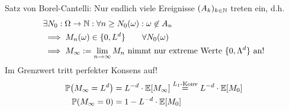 \begin{beisp}[Wählermodell]
Satz von Borel-Cantelli: Nur endlich viele Ereignisse $(A_k)_{k\in\mathbb{N}}$ treten ein, d.h.
\begin{align*}
&\exists N_0:\Omega\to\mathbb{N}:\forall n\geq N_0(\omega):\omega\not\in A_n\\
&\implies M_n(\omega)\in\lbrace0,L^d\rbrace\qquad\forall N_0(\omega)\\
&\implies M_\infty:=\lim\limits_{n\to\infty} M_n\text{ nimmt nur extreme Werte $\lbrace0,\Lambda^d\rbrace$ an!}
\end{align*}
Im Grenzwert tritt perfekter Konsens auf!
\begin{align*}
\mathbb{P}\big(M_\infty=L^d\big)&=L^{-d}\cdot\mathbb{E}[M_\infty]\stackrel{L_1\text{-Konv}}{=} L^{-d}\cdot\mathbb{E}[M_0]\\
\mathbb{P}(M_\infty=0)&=1-L^{-d}\cdot\mathbb{E}[M_0]
\end{align*}
\end{beisp}






